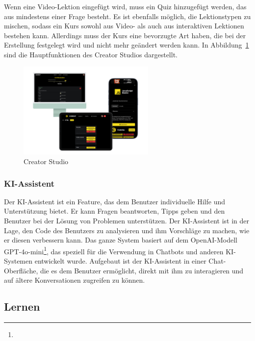 \documentclass[main.tex]{subfiles}
\begin{document}
    Wenn eine Video-Lektion eingefügt wird, muss ein Quiz hinzugefügt werden, das aus mindestens einer Frage besteht.
    Es ist ebenfalls möglich, die Lektionstypen zu mischen, sodass ein Kurs sowohl aus Video- als auch aus interaktiven Lektionen bestehen kann.
    Allerdings muss der Kurs eine bevorzugte Art haben, die bei der Erstellung festgelegt wird und nicht mehr geändert werden kann.
    In Abbildung~\ref{fig:creator-studio} sind die Hauptfunktionen des Creator Studios dargestellt.
    \begin{figure}[h] %
        \centering
        \includegraphics[width=0.6\textwidth]{assets/creator-studio}
        \caption{Creator Studio}
        \label{fig:creator-studio}
    \end{figure}
    \subsubsection{KI-Assistent}
    Der KI-Assistent ist ein Feature, das dem Benutzer individuelle Hilfe und Unterstützung bietet.
    Er kann Fragen beantworten, Tipps geben und den Benutzer bei der Lösung von Problemen unterstützen.
    Der KI-Assistent ist in der Lage, den Code des Benutzers zu analysieren und ihm Vorschläge zu machen, wie er diesen verbessern kann.
    Das ganze System basiert auf dem OpenAI-Modell GPT-4o-mini\footnote{}, das speziell für die Verwendung in Chatbots und anderen KI-Systemen entwickelt wurde.
    Aufgebaut ist der KI-Assistent in einer Chat-Oberfläche, die es dem Benutzer ermöglicht, direkt mit ihm zu interagieren und auf ältere Konversationen zugreifen zu können.
    \subsection{Lernen}
\end{document}
